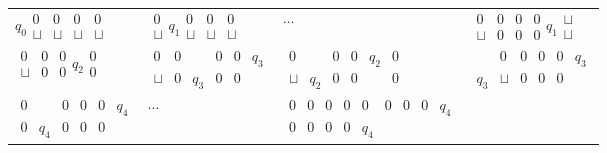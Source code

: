 \begin{frame}[allowframebreaks]
\begin{itemize}
\renewcommand{\arraystretch}{1.7}  
  \begin{tabular}{llll}
$ q_0
\begin{smallmatrix}
  0 &0 & 0 & 0 \\
  \sqcup & \sqcup & \sqcup & \sqcup
\end{smallmatrix}
$
&
$
\begin{smallmatrix}
  0 \\
  \sqcup 
\end{smallmatrix}
q_1
\begin{smallmatrix}
  0 & 0 & 0 \\
  \sqcup & \sqcup & \sqcup
\end{smallmatrix}
$
&           
$\cdots
$
&
$
\begin{smallmatrix}
  0 & 0 & 0 & 0\\
  \sqcup & 0  & 0 & 0
\end{smallmatrix}
q_1
\begin{smallmatrix}
  \sqcup\\
  \sqcup 
\end{smallmatrix}
$
\\
$
\begin{smallmatrix}
  0 & 0 & 0 \\
  \sqcup & 0  & 0 
\end{smallmatrix}
q_2
\begin{smallmatrix}
  0\\
  0
\end{smallmatrix}
$
&
$
\begin{smallmatrix}
  0 & 0 & & 0 & 0 & q_3\\
  \sqcup & 0 & q_3 & 0 & 0 &
\end{smallmatrix}
$
& 
$
\begin{smallmatrix}
  0 & & 0 & 0 & q_2 & 0\\
  \sqcup & q_2 & 0 & 0 &&  0 
\end{smallmatrix}
$
&
$
\begin{smallmatrix}
  & 0 & 0 & 0 & 0 & q_3\\
  q_3 & \sqcup & 0 & 0 & 0 
\end{smallmatrix}
$
\\
$
\begin{smallmatrix}
   0 & & 0 & 0 & 0 & q_4\\
  0 & q_4 & 0 & 0 & 0 
\end{smallmatrix}
$
& 
$\cdots$
&
$
\begin{smallmatrix}
   0 & 0 & 0 & 0 & 0 & 0 & 0 & 0 & q_4\\
  0 &  0 & 0 & 0 & q_4 &&&&
\end{smallmatrix}
$
&
\end{tabular}
\renewcommand{\arraystretch}{1}


\end{itemize}
\end{frame}
